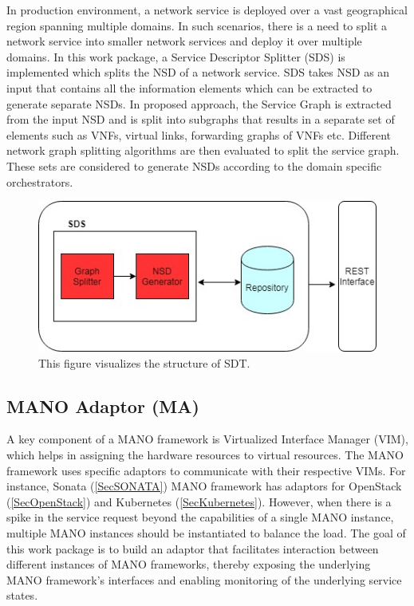 In production environment, a network service is deployed over a vast geographical region spanning multiple domains. In such scenarios, there is a need to split a network service into smaller network services and deploy it over multiple domains. In this work package, a Service Descriptor Splitter (SDS) is implemented which splits the NSD of a network service. SDS takes NSD as an input that contains all the information elements which can be extracted to generate separate NSDs. In proposed approach, the Service Graph is extracted from the input NSD and is split into subgraphs that results in a separate set of elements such as VNFs, virtual links, forwarding graphs of VNFs etc. Different network graph splitting algorithms are then evaluated to split the service graph. These sets are considered to generate NSDs according to the domain specific orchestrators.

\begin{figure}[h]
	\centering
	\includegraphics[width=0.7\linewidth]{figures/Splitter_Diagram}
	\caption{This figure visualizes the structure of SDT.}
	\label{fig:splitter_Diagram}
\end{figure}

\subsection{MANO Adaptor (MA)}

A key component of a MANO framework is Virtualized Interface Manager (VIM),  which helps in assigning the hardware resources to virtual resources. The MANO framework uses specific adaptors to communicate with their respective VIMs. For instance, Sonata  (\ref{SecSONATA}) MANO framework has adaptors for OpenStack (\ref{SecOpenStack}) and Kubernetes (\ref{SecKubernetes}). However, when there is a spike in the service request beyond the capabilities of a single MANO instance, multiple MANO instances should be instantiated to balance the load. The goal of this work package is to build an adaptor that facilitates interaction between different instances of MANO frameworks, thereby exposing the underlying MANO framework's interfaces and enabling monitoring of the underlying service states.

